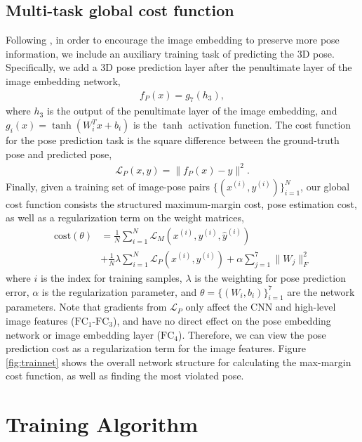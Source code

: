 \documentclass[10pt,twocolumn,letterpaper]{article}
\begin{document}
\subsection{Multi-task global cost function}
\vspace{-0.05in}
Following \cite{accv2014, hmlpeijcv},  in order to encourage the image embedding to preserve more pose information, we include an auxiliary training task of predicting the 3D pose.
Specifically, we add a 3D pose prediction layer after the penultimate layer of the image embedding network,
%
\begin{align}
f_{P}(x) = g_7(h_3),
\end{align}
where $h_3$ is the output of the penultimate layer of the image embedding, and $g_i(x)=\tanh(W_i^Tx+b_i)$ is the $\tanh$ activation function.
%
The cost function for the pose prediction task is the square difference between the ground-truth pose and predicted pose, 
\begin{align}
\label{eqn:costpredictpose}
\mathcal{L}_{P}(x, y) = \| f_{P}(x) - y\|^{2}.
\end{align}
Finally, given a training set of image-pose pairs $\{(x^{(i)}, y^{(i)})\}_{i=1}^N$,  our global cost function consists the structured maximum-margin cost,  pose estimation cost, as well as a regularization term on the weight matrices,
\begin{equation}
\begin{split}
\text{cost}(\theta) &= \frac{1}{N} \sum_{i=1}^{N} \mathcal{L}_{M}(x^{(i)},y^{(i)}, \hat{y}^{(i)}) 
\\
& + \frac{1}{N}\lambda\sum_{i=1}^{N} \mathcal{L}_{P}(x^{(i)}, y^{(i)}) 
+ \alpha\sum_{j=1}^7 \|W_j\|^2_F
\end{split}
\end{equation} 
where $i$ is the index for training samples,  $\lambda$ is the weighting for pose prediction error, $\alpha$ is the regularization parameter, and $\theta=\{(W_i,b_i)\}_{i=1}^7$ are the network parameters.
%
Note that gradients from $\mathcal{L}_{P}$ only affect the CNN and high-level image features ($\text{FC}_{1}$-$\text{FC}_{3}$), and have no direct effect on the pose embedding network or image embedding layer ($\text{FC}_{4}$). Therefore, we can view the pose prediction cost as a regularization term for the image features.
%
Figure \ref{fig:trainnet} shows the overall network structure for calculating the max-margin cost function, as well as finding the most violated pose.

\section{Training Algorithm} 
\label{sec:Training}
\vspace{-0.1in}
\end{document}
